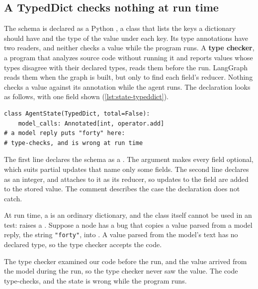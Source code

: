 \subsection{A TypedDict checks nothing at run time}
\label{sec:state-typeddict}

The schema is declared as a Python , a class that lists the keys a dictionary
should have and the type of the value under each key. Its type annotations have two readers, and
neither checks a value while the program runs. A \textbf{type checker}, a program that analyzes source
code without running it and reports values whose types disagree with their declared types, reads
them before the run. LangGraph reads them when the graph is built, but only to find each field's
reducer. Nothing checks a value against its annotation while the agent runs. The declaration looks as follows, with one field shown (\cref{lst:state-typeddict}).

\begin{lstlisting}[basicstyle=\ttfamily\footnotesize, columns=fixed, basewidth=0.525em, keepspaces=true, breaklines=false, xleftmargin=2pt, xrightmargin=2pt, caption={Illustrative code: the state schema declared as a TypedDict, with one field shown.}, label=lst:state-typeddict]
class AgentState(TypedDict, total=False):
    model_calls: Annotated[int, operator.add]
# a model reply puts "forty" here:
# type-checks, and is wrong at run time
\end{lstlisting}

The first line declares the schema as a . The argument 
makes every field optional, which suits partial updates that name only some fields. The second line
declares  as an integer, and  attaches
 to it as its reducer, so updates to the field are added to the stored value.
The comment describes the case the declaration does not catch.

At run time, a  is an ordinary dictionary, and the  class
itself cannot be used in an  test:  raises a
 \citep{pep589}. Suppose a node has a bug that copies a value parsed from
a model reply, the string \texttt{"forty"}, into . A value parsed from the
model's text has no declared type, so the type checker accepts the code.

The type checker examined our code before the run, and the value arrived from the model during the
run, so the type checker never saw the value. The code type-checks, and the state is wrong while the
program runs.

